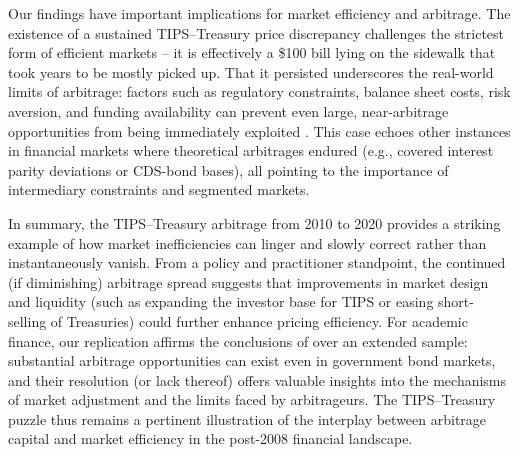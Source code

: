 \documentclass[12pt]{article}
\begin{document}
Our findings have important implications for market efficiency and arbitrage. The existence of a sustained TIPS–Treasury price discrepancy 
challenges the strictest form of efficient markets – it is effectively a \$100 bill lying on the sidewalk that took years to be mostly picked up. 
That it persisted underscores the real-world limits of arbitrage: factors such as regulatory constraints, balance sheet costs, risk aversion, and 
funding availability can prevent even large, near-arbitrage opportunities from being immediately exploited \citep{Fleckenstein}. 
This case echoes other instances in financial markets where theoretical arbitrages endured 
(e.g., covered interest parity deviations or CDS-bond bases), all pointing to the importance of intermediary constraints and segmented markets. 

In summary, the TIPS–Treasury arbitrage from 2010 to 2020 provides a striking example of how market inefficiencies can 
linger and slowly correct rather than instantaneously vanish. From a policy and practitioner standpoint, the continued (if diminishing) 
arbitrage spread suggests that improvements in market design and liquidity (such as expanding the investor base for TIPS or easing short-selling of 
Treasuries) could further enhance pricing efficiency. For academic finance, our replication affirms the conclusions of \cite{Fleckenstein}
over an extended sample: substantial arbitrage opportunities can exist even in government bond markets, and their resolution (or lack thereof) 
offers valuable insights into the mechanisms of market adjustment and the limits faced by arbitrageurs. The TIPS–Treasury puzzle thus remains a 
pertinent illustration of the interplay between arbitrage capital and market efficiency in the post-2008 financial landscape. 





\end{document}
